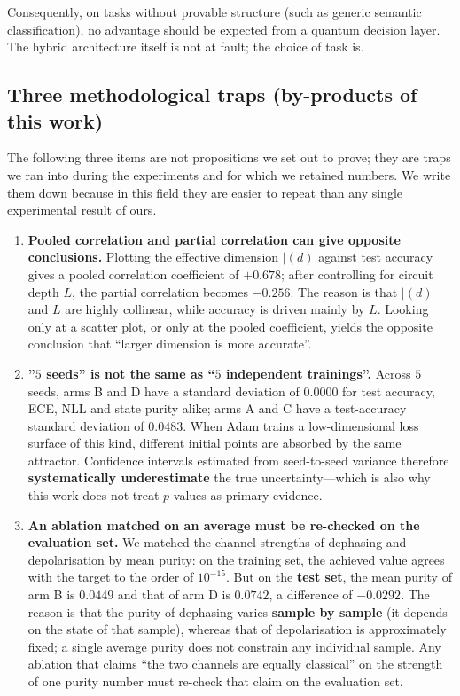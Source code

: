 \documentclass{article}
\begin{document}
Consequently, on tasks without provable structure (such as generic
semantic classification), no advantage should be expected from a quantum
decision layer. The hybrid architecture itself is not at fault; the
choice of task is.

\subsection{Three methodological traps (by-products of this work)}

The following three items are not propositions we set out to prove; they
are traps we ran into during the experiments and for which we retained
numbers. We write them down because in this field they are easier to
repeat than any single experimental result of ours.

\begin{enumerate}
\item
  \textbf{Pooled correlation and partial correlation can give opposite
  conclusions.} Plotting the effective dimension \(|(d)\) against test
  accuracy gives a pooled correlation coefficient of \(+ 0.678\); after
  controlling for circuit depth \(L\), the partial correlation becomes
  \(- 0.256\). The reason is that \(|(d)\) and \(L\) are highly
  collinear, while accuracy is driven mainly by \(L\). Looking only at a
  scatter plot, or only at the pooled coefficient, yields the opposite
  conclusion that ``larger dimension is more accurate''.
\item
  \textbf{''\(5\) seeds'' is not the same as ``\(5\) independent
  trainings''.} Across \(5\) seeds, arms B and D have a standard
  deviation of \(0.0000\) for test accuracy, ECE, NLL and state purity
  alike; arms A and C have a test-accuracy standard deviation of
  \(0.0483\). When Adam trains a low-dimensional loss surface of this
  kind, different initial points are absorbed by the same attractor.
  Confidence intervals estimated from seed-to-seed variance therefore
  \textbf{systematically underestimate} the true uncertainty---which is
  also why this work does not treat \(p\) values as primary evidence.
\item
  \textbf{An ablation matched on an average must be re-checked on the
  evaluation set.} We matched the channel strengths of dephasing and
  depolarisation by mean purity: on the training set, the achieved value
  agrees with the target to the order of \(10^{- 15}\). But on the
  \textbf{test set}, the mean purity of arm B is \(0.0449\) and that of
  arm D is \(0.0742\), a difference of \(- 0.0292\). The reason is that
  the purity of dephasing varies \textbf{sample by sample} (it depends
  on the state of that sample), whereas that of depolarisation is
  approximately fixed; a single average purity does not constrain any
  individual sample. Any ablation that claims ``the two channels are
  equally classical'' on the strength of one purity number must re-check
  that claim on the evaluation set.
\end{enumerate}
\end{document}
